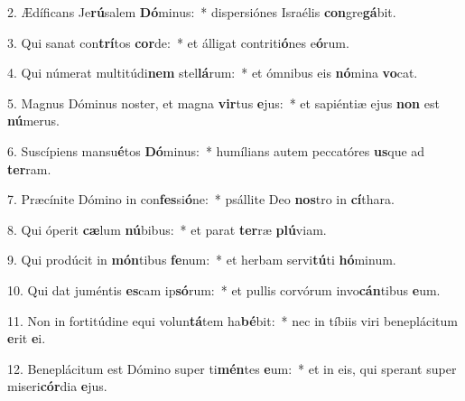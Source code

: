 2. Ædíficans Je\textbf{rú}salem \textbf{Dó}minus:~*  dispersiónes Israélis \textbf{con}gre\textbf{gá}bit.\

3. Qui sanat con\textbf{trí}tos \textbf{cor}de:~*  et álligat contriti\textbf{ó}nes e\textbf{ó}rum.\

4. Qui númerat multitúdi\textbf{nem} stel\textbf{lá}rum:~*  et ómnibus eis \textbf{nó}mina \textbf{vo}cat.\

5. Magnus Dóminus noster, et magna \textbf{vir}tus \textbf{e}jus:~*  et sapiéntiæ ejus \textbf{non} est \textbf{nú}merus.\

6. Suscípiens mansu\textbf{é}tos \textbf{Dó}minus:~*  humílians autem peccatóres \textbf{us}que ad \textbf{ter}ram.\

7. Præcínite Dómino in con\textbf{fes}si\textbf{ó}ne:~*  psállite Deo \textbf{nos}tro in \textbf{cí}thara.\

8. Qui óperit \textbf{cæ}lum \textbf{nú}bibus:~*  et parat \textbf{ter}ræ \textbf{plú}viam.\

9. Qui prodúcit in \textbf{món}tibus \textbf{fe}num:~*  et herbam servi\textbf{tú}ti \textbf{hó}minum.\

10. Qui dat juméntis \textbf{es}cam ip\textbf{só}rum:~*  et pullis corvórum invo\textbf{cán}tibus \textbf{e}um.\

11. Non in fortitúdine equi volun\textbf{tá}tem ha\textbf{bé}bit:~*  nec in tíbiis viri beneplácitum \textbf{e}rit \textbf{e}i.\

12. Beneplácitum est Dómino super ti\textbf{mén}tes \textbf{e}um:~*  et in eis, qui sperant super miseri\textbf{cór}dia \textbf{e}jus.\

